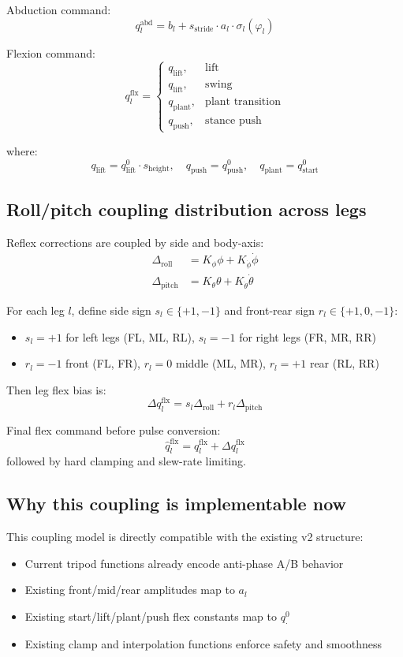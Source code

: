 \documentclass[11pt]{article}
\begin{document}
Abduction command:
\[
q^{\mathrm{abd}}_l = b_l + s_{\mathrm{stride}}\cdot a_l\cdot \sigma_l(\varphi_l)
\]

Flexion command:
\[
q^{\mathrm{flx}}_l=
\begin{cases}
q_{\mathrm{lift}},  & \text{lift}\\
q_{\mathrm{lift}},  & \text{swing}\\
q_{\mathrm{plant}}, & \text{plant transition}\\
q_{\mathrm{push}},  & \text{stance push}
\end{cases}
\]

where:
\[
q_{\mathrm{lift}} = q^0_{\mathrm{lift}}\cdot s_{\mathrm{height}},\quad
q_{\mathrm{push}} = q^0_{\mathrm{push}},\quad
q_{\mathrm{plant}} = q^0_{\mathrm{start}}
\]

\subsection*{Roll/pitch coupling distribution across legs}

Reflex corrections are coupled by side and body-axis:
\begin{align}
\Delta_{\mathrm{roll}} &= K_{\phi}\phi + K_{\dot{\phi}}\dot{\phi}\\
\Delta_{\mathrm{pitch}} &= K_{\theta}\theta + K_{\dot{\theta}}\dot{\theta}
\end{align}

For each leg $l$, define side sign $s_l\in\{+1,-1\}$ and front-rear sign $r_l\in\{+1,0,-1\}$:
\begin{itemize}
    \item $s_l=+1$ for left legs (FL, ML, RL), $s_l=-1$ for right legs (FR, MR, RR)
    \item $r_l=-1$ front (FL, FR), $r_l=0$ middle (ML, MR), $r_l=+1$ rear (RL, RR)
\end{itemize}

Then leg flex bias is:
\[
\Delta q^{\mathrm{flx}}_l = s_l\Delta_{\mathrm{roll}} + r_l\Delta_{\mathrm{pitch}}
\]

Final flex command before pulse conversion:
\[
\hat{q}^{\mathrm{flx}}_l = q^{\mathrm{flx}}_l + \Delta q^{\mathrm{flx}}_l
\]
followed by hard clamping and slew-rate limiting.

\subsection*{Why this coupling is implementable now}

This coupling model is directly compatible with the existing v2 structure:
\begin{itemize}
    \item Current tripod functions already encode anti-phase A/B behavior
    \item Existing front/mid/rear amplitudes map to $a_l$
    \item Existing start/lift/plant/push flex constants map to $q^0_{\cdot}$
    \item Existing clamp and interpolation functions enforce safety and smoothness
\end{itemize}
\end{document}
